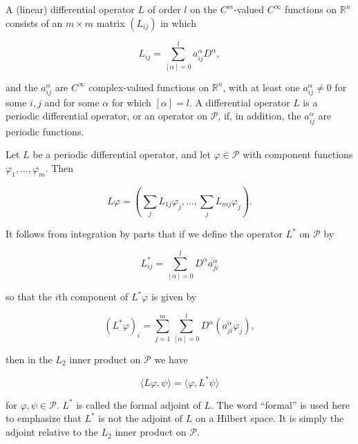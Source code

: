 \begin{definition}\label{thm:6.24}
A (linear) differential operator $L$ of order $l$ on the  $ C^{m} $-valued  $ C^{\infty} $ functions on  $ \mathbb{R}^{n} $ consists of an  $ m \times m $ matrix  $ (L_{ij}) $ in which 

\begin{equation}
\tag{1}\label{eq:6.24:1}
L_{ij}=\sum_{[\alpha]=0}^{l}a_{ij}^{\alpha}D^{\alpha},
\end{equation}

and the $a_{ij}^{\alpha}$ are $C^{\infty}$ complex-valued functions on $\mathbb{R}^{n}$, with at least one $a_{ij}^{\alpha} \neq 0$ for some $i, j$ and for some $\alpha$ for which $[\alpha] = l$. A differential operator $L$ is a periodic differential operator, or an operator on $\mathcal{P}$, if, in addition, the $a_{ij}^{\alpha}$ are periodic functions. 

Let $L$ be a periodic differential operator, and let $\varphi \in \mathcal{P}$ with component functions $\varphi_1, \ldots, \varphi_m$. Then

\begin{equation}
\tag{2}\label{eq:6.24:2}
L\varphi=\left(\sum_{j}L_{1j}\varphi_{j},\ldots,\sum_{j}L_{mj}\varphi_{j}\right).
\end{equation}

It follows from integration by parts that if we define the operator  $ L^{*} $ on  $ \mathcal{P} $ by

\begin{equation}
\tag{3}\label{eq:6.24:3}
L_{ij}^{*}=\sum_{[\alpha]=0}^{l}D^{\alpha}\overline{a_{ji}^{\alpha}}
\end{equation}

so that the $i$th component of  $ L^{*}\varphi $ is given by

\begin{equation}
\tag{4}\label{eq:6.24:4}
(L^{*}\varphi)_{i}=\sum_{j=1}^{m}\sum_{[\alpha]=0}^{l}D^{\alpha}(\overline{a_{ji}^{\alpha}}\varphi_{j}),
\end{equation}

then in the $L_{2}$ inner product on $\mathcal{P}$ we have

\begin{equation}
\tag{5}\label{eq:6.24:5}
\langle L\varphi,\psi\rangle=\langle\varphi,L^{*}\psi\rangle
\end{equation}

for $\varphi, \psi \in \mathcal{P}$. $L^{*}$ is called the formal adjoint of $L$. The word “formal” is used here to emphasize that $L^{*}$ is not the adjoint of $L$ on a Hilbert space. It is simply the adjoint relative to the $L_{2}$ inner product on $\mathcal{P}$.

\end{definition}

